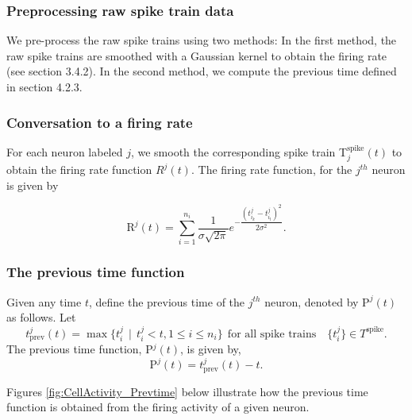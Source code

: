 \subsubsection{Preprocessing raw spike train data}
We pre-process the raw spike trains using two methods: In the first method, the raw spike trains are smoothed with a Gaussian kernel to obtain the firing rate (see section 3.4.2). In the second method, we compute the previous time defined in section 4.2.3.\\


\subsubsection{Conversation to a firing rate}
For each neuron labeled $j$,  we smooth the corresponding spike train T$^{\text{spike}}_{j}(t)$ to obtain the firing rate function $R^{j}(t).$ The  firing rate function, for the $j^{th}$ neuron is given by

\begin{equation} \label{jfirerate}
\text{R}^{j}(t) = \displaystyle \sum_{i=1}^{n_{i}}  \frac{1}{\sigma \sqrt{2\pi}} 
e^{-\dfrac{(t_{i_{k}}^{j}  - t_{i_{l}}^{j})^2}{2\sigma^2}}. 
\end{equation}

\subsubsection{The previous time function}
Given any time $t$, define the previous time of the $j^{th}$ neuron, denoted by $\text{P}^{j}(t)$ as follows. Let 
\[
t^{j}_{\text{prev}}(t) = \displaystyle \max  \{  t^{j}_{i} \ \ | \ \ t^{j}_{i} < t, 1 \leq i \leq n_{i} \} \ \ \text{for all spike trains} \quad  \{t^{j}_{i}\} \in T^{\text{spike}}.
\]
The previous time function, P$^{j}(t)$, is given by, 
\begin{equation}\label{prevtimefun}
\text{P}^{j}(t) = t^{j}_{\text{prev}}(t) - t.
\end{equation}


Figures \ref{fig:CellActivity_Prevtime} below illustrate how the previous time function is obtained from
the firing activity of a given neuron.


